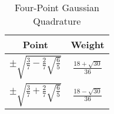\begin{table}[h]
  \centering
  \caption{Four-Point Gaussian Quadrature}\label{t:gaussQuad}
  \begin{tabular}{|c|c|}\hline
    Point & Weight \\\hline
    $\pm \sqrt{\frac{3}{7} - \frac{2}{7}\sqrt{\frac{6}{5}}}$ & $\frac{18 + \sqrt{30}}{36}$ \\\hline
    $\pm \sqrt{\frac{3}{7} + \frac{2}{7}\sqrt{\frac{6}{5}}}$ & $\frac{18 - \sqrt{30}}{36}$ \\\hline
  \end{tabular}
\end{table}